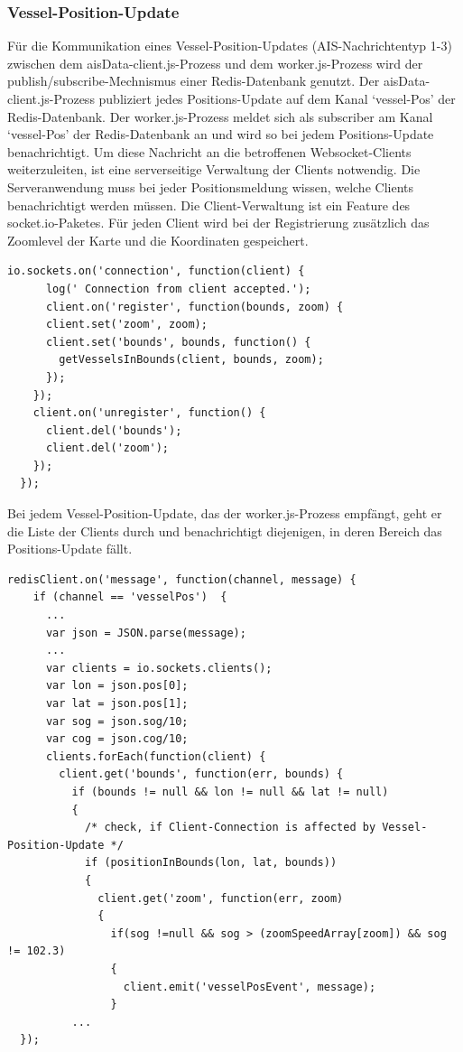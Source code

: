 \subsubsection{Vessel-Position-Update}\label{Vessel-Position-Update}
Für die Kommunikation eines Vessel-Position-Updates (AIS-Nachrichtentyp 1-3) zwischen dem aisData-client.js-Prozess und dem worker.js-Prozess wird der publish/subscribe-Mechnismus einer Redis-Datenbank genutzt. Der aisData-client.js-Prozess publiziert jedes Positions-Update auf dem Kanal ‘vessel-Pos’ der Redis-Datenbank. Der worker.js-Prozess meldet sich als subscriber am Kanal ‘vessel-Pos’ der Redis-Datenbank an und wird so bei jedem Positions-Update benachrichtigt.
Um diese Nachricht an die betroffenen Websocket-Clients weiterzuleiten, ist eine serverseitige Verwaltung der Clients notwendig. Die Serveranwendung muss bei jeder Positionsmeldung wissen, welche Clients benachrichtigt werden müssen. Die Client-Verwaltung ist ein Feature des socket.io-Paketes. Für jeden Client wird bei der Registrierung zusätzlich das Zoomlevel der Karte und die Koordinaten gespeichert.
\begin{lstlisting}[caption= Speichern der übermittelten Client-Daten in worker.js, label=Speichern der übermittelten Client-Daten in worker.js]
io.sockets.on('connection', function(client) {
      log(' Connection from client accepted.');
      client.on('register', function(bounds, zoom) {
      client.set('zoom', zoom);
      client.set('bounds', bounds, function() {
        getVesselsInBounds(client, bounds, zoom);
      });
    });
    client.on('unregister', function() {
      client.del('bounds');
      client.del('zoom');
    });
  });
  \end{lstlisting}
  Bei jedem Vessel-Position-Update, das der worker.js-Prozess empfängt, geht er die Liste der Clients durch und benachrichtigt diejenigen, in deren Bereich das Positions-Update fällt.
\begin{lstlisting}[caption= Weiterleitung von Positions-Updates an Websocket-Clients in worker.js, label= Weiterleitung von Positions-Updates an Websocket-Clients in worker.js]
 redisClient.on('message', function(channel, message) {
    if (channel == 'vesselPos')  {
      ...
      var json = JSON.parse(message);
      ...
      var clients = io.sockets.clients();
      var lon = json.pos[0];
      var lat = json.pos[1];
      var sog = json.sog/10;
      var cog = json.cog/10;
      clients.forEach(function(client) {
        client.get('bounds', function(err, bounds) {
          if (bounds != null && lon != null && lat != null) 
          {
            /* check, if Client-Connection is affected by Vessel-Position-Update */
            if (positionInBounds(lon, lat, bounds)) 
            {
              client.get('zoom', function(err, zoom) 
              {
                if(sog !=null && sog > (zoomSpeedArray[zoom]) && sog != 102.3)
                {
                  client.emit('vesselPosEvent', message);
                }
          ...
  });
\end{lstlisting}

